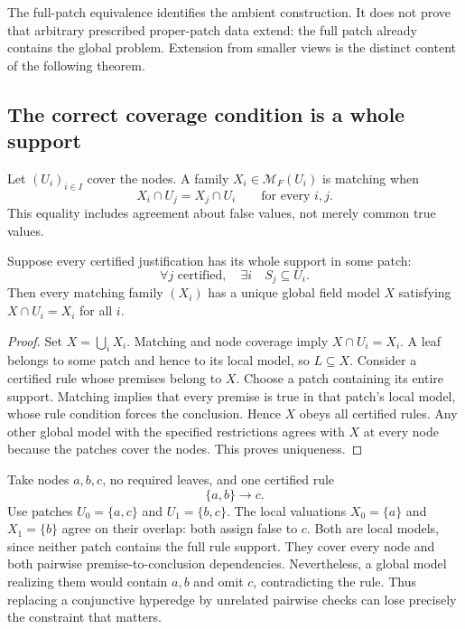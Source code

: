 The full-patch equivalence identifies the ambient construction. It does not prove that arbitrary prescribed proper-patch data extend: the full patch already contains the global problem. Extension from smaller views is the distinct content of the following theorem.

\subsection{The correct coverage condition is a whole support}

Let $(U_i)_{i\in I}$ cover the nodes. A family $X_i\in\mathcal M_F(U_i)$ is matching when
\[
X_i\cap U_j=X_j\cap U_i\qquad\text{for every }i,j.
\]
This equality includes agreement about false values, not merely common true values.

\begin{theorem}
\label{thm:support-gluing}
Suppose every certified justification has its whole support in some patch:
\[
\forall j\text{ certified},\quad\exists i\quad S_j\subseteq U_i.
\]
Then every matching family $(X_i)$ has a unique global field model $X$ satisfying $X\cap U_i=X_i$ for all $i$.
\end{theorem}
\begin{proof}
Set $X=\bigcup_iX_i$. Matching and node coverage imply $X\cap U_i=X_i$. A leaf belongs to some patch and hence to its local model, so $L\subseteq X$. Consider a certified rule whose premises belong to $X$. Choose a patch containing its entire support. Matching implies that every premise is true in that patch's local model, whose rule condition forces the conclusion. Hence $X$ obeys all certified rules. Any other global model with the specified restrictions agrees with $X$ at every node because the patches cover the nodes. This proves uniqueness.
\end{proof}

\begin{example}
Take nodes $a,b,c$, no required leaves, and one certified rule
\[
\{a,b\}\longrightarrow c.
\]
Use patches $U_0=\{a,c\}$ and $U_1=\{b,c\}$. The local valuations $X_0=\{a\}$ and $X_1=\{b\}$ agree on their overlap: both assign false to $c$. Both are local models, since neither patch contains the full rule support. They cover every node and both pairwise premise-to-conclusion dependencies. Nevertheless, a global model realizing them would contain $a,b$ and omit $c$, contradicting the rule. Thus replacing a conjunctive hyperedge by unrelated pairwise checks can lose precisely the constraint that matters.
\end{example}

